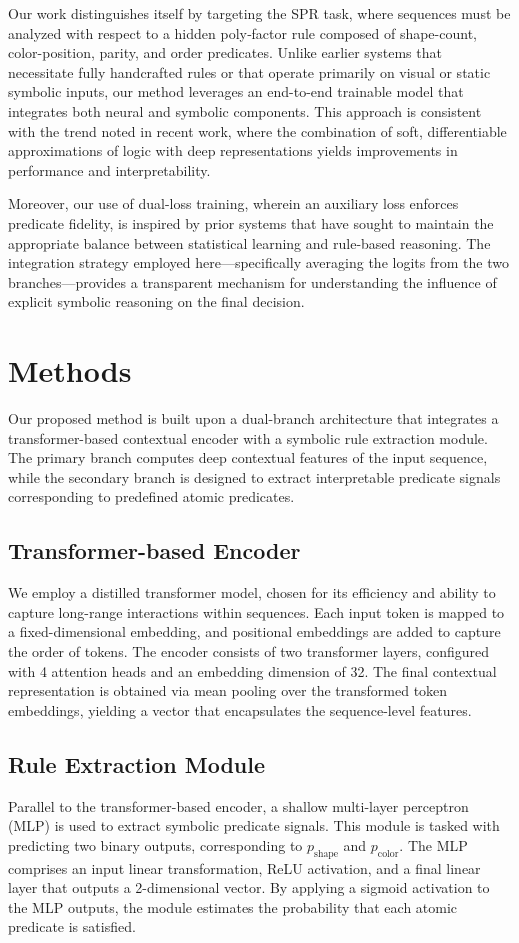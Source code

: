 \documentclass{article}
\begin{document}
Our work distinguishes itself by targeting the SPR task, where sequences must be analyzed with respect to a hidden poly‐factor rule composed of shape-count, color-position, parity, and order predicates. Unlike earlier systems that necessitate fully handcrafted rules or that operate primarily on visual or static symbolic inputs, our method leverages an end-to-end trainable model that integrates both neural and symbolic components. This approach is consistent with the trend noted in recent work, where the combination of soft, differentiable approximations of logic with deep representations yields improvements in performance and interpretability.

Moreover, our use of dual-loss training, wherein an auxiliary loss enforces predicate fidelity, is inspired by prior systems that have sought to maintain the appropriate balance between statistical learning and rule-based reasoning. The integration strategy employed here—specifically averaging the logits from the two branches—provides a transparent mechanism for understanding the influence of explicit symbolic reasoning on the final decision.

\section{Methods}
Our proposed method is built upon a dual-branch architecture that integrates a transformer-based contextual encoder with a symbolic rule extraction module. The primary branch computes deep contextual features of the input sequence, while the secondary branch is designed to extract interpretable predicate signals corresponding to predefined atomic predicates.

\subsection{Transformer-based Encoder}
We employ a distilled transformer model, chosen for its efficiency and ability to capture long-range interactions within sequences. Each input token is mapped to a fixed-dimensional embedding, and positional embeddings are added to capture the order of tokens. The encoder consists of two transformer layers, configured with 4 attention heads and an embedding dimension of 32. The final contextual representation is obtained via mean pooling over the transformed token embeddings, yielding a vector that encapsulates the sequence-level features.

\subsection{Rule Extraction Module}
Parallel to the transformer-based encoder, a shallow multi-layer perceptron (MLP) is used to extract symbolic predicate signals. This module is tasked with predicting two binary outputs, corresponding to \( p_{\text{shape}} \) and \( p_{\text{color}} \). The MLP comprises an input linear transformation, ReLU activation, and a final linear layer that outputs a 2-dimensional vector. By applying a sigmoid activation to the MLP outputs, the module estimates the probability that each atomic predicate is satisfied.
\end{document}
